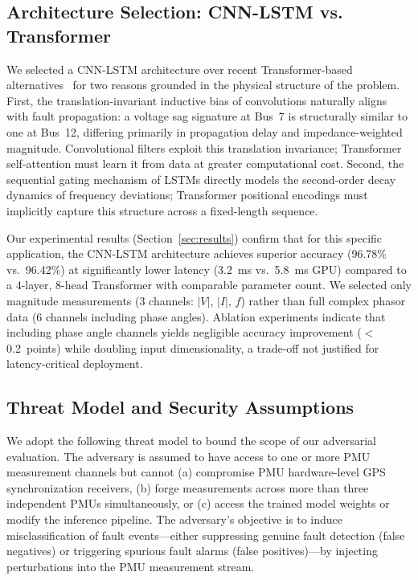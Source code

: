 \documentclass[journal]{IEEEtran}
\begin{document}
\subsection{Architecture Selection: CNN-LSTM vs. Transformer}

We selected a CNN-LSTM architecture over recent Transformer-based alternatives~\cite{ref_khan,ref_zhang_liu} for two reasons grounded in the physical structure of the problem. First, the translation-invariant inductive bias of convolutions naturally aligns with fault propagation: a voltage sag signature at Bus~7 is structurally similar to one at Bus~12, differing primarily in propagation delay and impedance-weighted magnitude. Convolutional filters exploit this translation invariance; Transformer self-attention must learn it from data at greater computational cost. Second, the sequential gating mechanism of LSTMs directly models the second-order decay dynamics of frequency deviations; Transformer positional encodings must implicitly capture this structure across a fixed-length sequence.

Our experimental results (Section~\ref{sec:results}) confirm that for this specific application, the CNN-LSTM architecture achieves superior accuracy (96.78\% vs.~96.42\%) at significantly lower latency (3.2~ms vs.~5.8~ms GPU) compared to a 4-layer, 8-head Transformer with comparable parameter count. We selected only magnitude measurements (3 channels: $|V|$, $|I|$, $f$) rather than full complex phasor data (6 channels including phase angles). Ablation experiments indicate that including phase angle channels yields negligible accuracy improvement ($<$0.2~points) while doubling input dimensionality, a trade-off not justified for latency-critical deployment.

\subsection{Threat Model and Security Assumptions}
\label{sec:threat}

We adopt the following threat model to bound the scope of our adversarial evaluation. The adversary is assumed to have access to one or more PMU measurement channels but cannot (a) compromise PMU hardware-level GPS synchronization receivers, (b) forge measurements across more than three independent PMUs simultaneously, or (c) access the trained model weights or modify the inference pipeline. The adversary's objective is to induce misclassification of fault events---either suppressing genuine fault detection (false negatives) or triggering spurious fault alarms (false positives)---by injecting perturbations into the PMU measurement stream.
\end{document}
